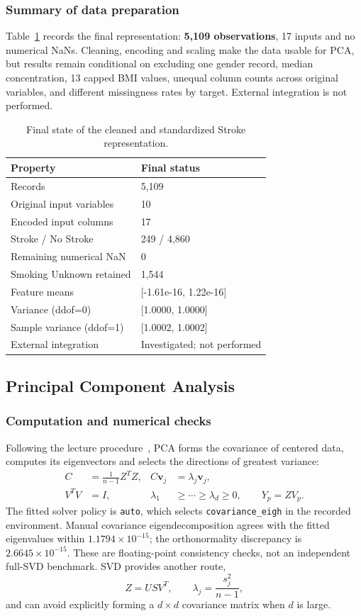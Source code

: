 \documentclass[12pt, a4paper]{article}
\begin{document}
\subsubsection{Summary of data preparation}
Table~\ref{tab:stroke-state} records the final representation: \textbf{5,109 observations}, 17 inputs and no numerical NaNs. Cleaning, encoding and scaling make the data usable for PCA, but results remain conditional on excluding one gender record, median concentration, 13 capped BMI values, unequal column counts across original variables, and different missingness rates by target. External integration is not performed.
\begin{table}[htbp]
\centering\small
\setlength{\tabcolsep}{4pt}\renewcommand{\arraystretch}{1.12}
\caption{Final state of the cleaned and standardized Stroke representation.}
\label{tab:stroke-state}
\begin{tabular}{p{.61\linewidth}p{.30\linewidth}}
\toprule
\raggedright \textbf{Property} & \raggedright \textbf{Final status} \tabularnewline
\midrule
\raggedright Records & \raggedright 5,109 \tabularnewline
\raggedright Original input variables & \raggedright 10 \tabularnewline
\raggedright Encoded input columns & \raggedright 17 \tabularnewline
\raggedright Stroke / No Stroke & \raggedright 249 / 4,860 \tabularnewline
\raggedright Remaining numerical NaN & \raggedright 0 \tabularnewline
\raggedright Smoking Unknown retained & \raggedright 1,544 \tabularnewline
\raggedright Feature means & \raggedright [-1.61e-16, 1.22e-16] \tabularnewline
\raggedright Variance (ddof=0) & \raggedright [1.0000, 1.0000] \tabularnewline
\raggedright Sample variance (ddof=1) & \raggedright [1.0002, 1.0002] \tabularnewline
\raggedright External integration & \raggedright Investigated; not performed \tabularnewline
\bottomrule
\end{tabular}
\end{table}

\subsection{Principal Component Analysis}
\subsubsection{Computation and numerical checks}
Following the lecture procedure~\cite{dm3}, PCA forms the covariance of centered data, computes its eigenvectors and selects the directions of greatest variance:
\begin{align}
C&=\frac1{n-1}Z^TZ,& C\mathbf v_j&=\lambda_j\mathbf v_j,\\
V^TV&=I,& \lambda_1&\ge\cdots\ge\lambda_d\ge0,\qquad Y_p=ZV_p.
\end{align}
The fitted solver policy is \texttt{auto}, which selects \texttt{covariance\_eigh} in the recorded environment. Manual covariance eigendecomposition agrees with the fitted eigenvalues within $1.1794\times10^{-15}$; the orthonormality discrepancy is $2.6645\times10^{-15}$. These are floating-point consistency checks, not an independent full-SVD benchmark. SVD provides another route,
\[
Z=USV^T,\qquad \lambda_j=\frac{s_j^2}{n-1},
\]
and can avoid explicitly forming a $d\times d$ covariance matrix when $d$ is large.
\end{document}
